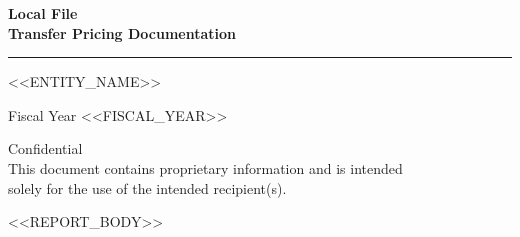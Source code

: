 \documentclass[11pt,a4paper]{article}
\begin{document}
\begin{titlepage}
\thispagestyle{empty}
\vspace*{\fill}
\begin{center}

{\LARGE\bfseries Local File}\\[8pt]
{\LARGE\bfseries Transfer Pricing Documentation}

\vspace{24pt}
\textcolor{rulecolor}{\rule{0.4\textwidth}{0.4pt}}

\vspace{24pt}
{\Large <<ENTITY_NAME>>}

\vspace{12pt}
{\large Fiscal Year <<FISCAL_YEAR>>}

\vspace{\fill}

{\small\color{covertext} Confidential}\\[4pt]
{\small\color{covertext} This document contains proprietary information and is intended}\\
{\small\color{covertext} solely for the use of the intended recipient(s).}

\end{center}
\vspace{24pt}
\end{titlepage}

\tableofcontents
\newpage


<<REPORT_BODY>>
\end{document}
